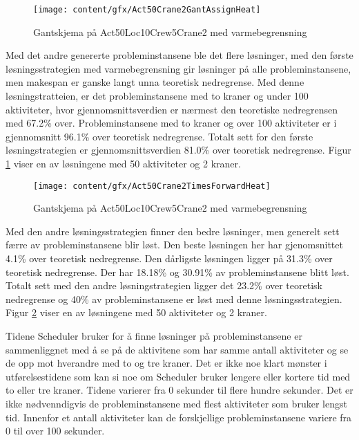 \begin{figure}[!h]
\centering
\texttt{[image: content/gfx/Act50Crane2GantAssignHeat]}
\caption{Gantskjema på Act50Loc10Crew5Crane2 med varmebegrensning}
\label{fig:GantWithAct50Loc10Crew5Crane2AssignHeat}
\end{figure}
Med det andre genererte probleminstansene ble det flere løsninger, med den første løsningsstrategien med varmebegrensning gir løsninger på alle probleminstansene, men makespan er ganske langt unna teoretisk nedregrense. Med denne løsningstratteien, er det probleminstansene med to kraner og under 100 aktiviteter, hvor gjennomsnittsverdien er nærmest den teoretiske nedregrensen med 67.2\% over. Probleminstansene med to kraner og over 100 aktiviteter er i gjennomsnitt 96.1\% over teoretisk nedregrense. Totalt sett for den første løsningstrategien er gjennomsnittsverdien 81.0\% over teoretisk nedregrense. Figur \ref{fig:GantWithAct50Loc10Crew5Crane2AssignHeat} viser en av løsningene med 50 aktiviteter og 2 kraner.

\begin{figure}[!h]
\centering
\texttt{[image: content/gfx/Act50Crane2TimesForwardHeat]}
\caption{Gantskjema på Act50Loc10Crew5Crane2 med varmebegrensning}
\label{fig:GantWithAct50Loc10Crew5Crane2TFHeat}
\end{figure}
Med den andre løsningsstrategien finner den bedre løsninger, men generelt sett færre av probleminstansene blir løst. Den beste løsningen her har gjenomsnittet 4.1\% over teoretisk nedregrense. Den dårligste løsningen ligger på 31.3\% over teoretisk nedregrense. Der har 18.18\% og 30.91\% av probleminstansene blitt løst. Totalt sett med den andre løsningstrategien ligger det 23.2\% over teoretisk nedregrense og 40\% av probleminstansene er løst med denne løsningsstrategien. Figur \ref{fig:GantWithAct50Loc10Crew5Crane2TFHeat} viser en av løsningene med 50 aktiviteter og 2 kraner.

Tidene Scheduler bruker for å finne løsninger på probleminstansene er sammenliggnet med å se på de aktivitene som har samme antall aktiviteter og se de opp mot hverandre med to og tre kraner. Det er ikke noe klart mønster i utførelsestidene som kan si noe om Scheduler bruker lengere eller kortere tid med to eller tre kraner. Tidene varierer fra 0 sekunder til flere hundre sekunder. Det er ikke nødvenndigvis de probleminstansene med flest aktiviteter som bruker lengst tid. Innenfor et antall aktiviteter kan de forskjellige probleminstansene variere fra 0 til over 100 sekunder.